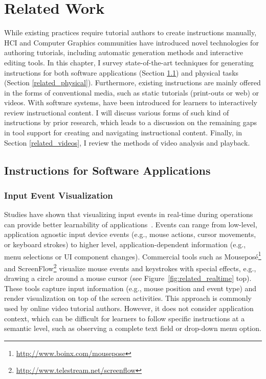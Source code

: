 
\chapter{Related Work}
\label{chapter_related_work}

While existing practices require tutorial authors to create instructions manually, HCI and Computer Graphics communities have introduced novel technologies for authoring tutorials, including automatic generation methods and interactive editing tools.
%
In this chapter, I survey state-of-the-art techniques for generating instructions for both software applications (Section \ref{related_software}) and physical tasks (Section \ref{related_physical}).
%
Furthermore, existing instructions are mainly offered in the forms of conventional media, such as static tutorials (print-outs or web) or videos. With software systems,  have been introduced for learners to interactively review instructional content. I will discuss various forms of such kind of instructions by prior research, which leads to a discussion on the remaining gaps in tool support for creating and navigating instructional content.
%
Finally, in Section \ref{related_videos}, I review the methods of video analysis and playback.


\section{Instructions for Software Applications}
\label{related_software}

\subsection{Input Event Visualization}

Studies have shown that visualizing input events in real-time during operations can provide better learnability of applications~\cite{Dixon:2010fb}. Events can range from low-level, application agnostic input device events (e.g., mouse actions, cursor movements, or keyboard strokes) to higher level, application-dependent information (e.g., menu selections or UI component changes).
%
Commercial tools such as Mouseposé\footnote{\url{http://www.boinx.com/mousepose}} and ScreenFlow\footnote{\url{http://www.telestream.net/screenflow}} visualize mouse events and keystrokes with special effects, e.g., drawing a circle around a mouse cursor (see Figure~\ref{fig:related_realtime} top). These tools capture input information (e.g., mouse position and event type) and render visualization on top of the screen activities. This approach is commonly used by online video tutorial authors. However, it does not consider application context, which can be difficult for learners to follow specific instructions at a semantic level, such as observing a complete text field or drop-down menu option.

